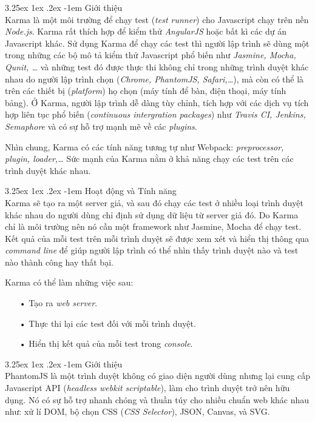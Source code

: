 \documentclass[12pt,a4paper,twoside]{article}
\makeatletter
\let\newcounter\@gobble\let\setcounter\@gobbletwo
\newcommand{\myparagraph}[1]{\paragraph{#1}\mbox{}\\} %
\newcounter{subsubsubsection}[subsubsection]
\renewcommand\paragraph{\@startsection{paragraph}{5}{\z@}%
  {3.25ex \@plus1ex \@minus.2ex}%
  {-1em}%
  {\normalfont\normalsize\bfseries}}
\makeatother
\begin{document}
\myparagraph{Giới thiệu}
Karma\cite{karma_1} là một môi trường để chạy test (\textit{test runner}) cho Javascript chạy trên nền \textit{Node.js}. Karma rất thích hợp để kiểm thử \textit{AngularJS} hoặc bất kì các dự án Javascript khác. Sử dụng Karma để chạy các test thì người lập trình sẽ dùng một trong những các bộ mô tả kiểm thử Javascript phổ biến như \textit{Jasmine, Mocha, Qunit, …} và những test đó được thực thi không chỉ trong những trình duyệt khác nhau do người lập trình chọn (\textit{Chrome, PhantomJS, Safari,…}), mà còn có thể là trên các thiết bị (\textit{platform}) họ chọn (máy tính để bàn, điện thoại, máy tính bảng). Ở Karma, người lập trình dễ dàng tùy chỉnh, tích hợp với các dịch vụ tích hợp liên tục phổ biến (\textit{continuous intergration packages}) như \textit{Travis CI, Jenkins, Semaphore} và có sự hỗ trợ mạnh mẽ về các \textit{plugins}.

Nhìn chung, Karma có các tính năng tương tự như Webpack: \textit{preprocessor, plugin, loader,…} Sức mạnh của Karma nằm ở khả năng chạy các test trên các trình duyệt khác nhau. 

\myparagraph{Hoạt động và Tính năng}
Karma sẽ tạo ra một server giả, và sau đó chạy các test ở nhiều loại trình duyệt khác nhau do người dùng chỉ định sử dụng dữ liệu từ server giả đó. Do Karma chỉ là môi trường nên nó cần một framework như Jasmine, Mocha để chạy test. Kết quả của mỗi test trên mỗi trình duyệt sẽ được xem xét và hiển thị thông qua \textit{command line} để giúp người lập trình có thể nhìn thấy trình duyệt nào và test nào thành công hay thất bại.

Karma có thể làm những việc sau:
\begin{itemize}
\item[•] Tạo ra \textit{web server}.
\item[•] Thực thi lại các test đối với mỗi trình duyệt.
\item[•] Hiển thị kết quả của mỗi test trong \textit{console}.
\end{itemize}

\myparagraph{Giới thiệu}
PhantomJS là một trình duyệt không có giao diện người dùng nhưng lại cung cấp Javascript API (\textit{headless webkit scriptable}), làm cho trình duyệt trở nên hữu dụng. Nó có sự hỗ trợ nhanh chóng và thuần túy cho nhiều chuẩn web khác nhau như: xử lí DOM, bộ chọn CSS (\textit{CSS Selector}), JSON, Canvas, và SVG.
\end{document}
